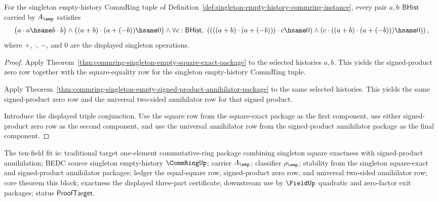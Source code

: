 \begin{theorem}
\label{thm:commring-singleton-empty-square-signed-product-package}
For the singleton empty-history CommRing tuple of
Definition~\ref{def:singleton-empty-history-commring-instance}, every pair
$a,b:\mathsf{BHist}$ carried by $A_{\emp}$ satisfies
$$
\bigl(a\cdot a\hsame b\cdot b\bigr)
\land
\bigl((a+b)\cdot(a+(-b))\hsame0\bigr)
\land
\forall c:\mathsf{BHist},\
\left(
(((a+b)\cdot(a+(-b)))\cdot c\hsame0)
\land
(c\cdot((a+b)\cdot(a+(-b)))\hsame0)
\right),
$$
where $+$, $\cdot$, $-$, and $0$ are the displayed singleton operations.
\end{theorem}
\begin{proof}
Apply
Theorem~\ref{thm:commring-singleton-empty-square-exact-package} to the selected
histories $a,b$. This yields the signed-product zero row together with the
square-equality row for the singleton empty-history CommRing tuple.

Apply
Theorem~\ref{thm:commring-singleton-empty-signed-product-annihilator-package} to
the same selected histories. This yields the same signed-product zero row and
the universal two-sided annihilator row for that signed product.

Introduce the displayed triple conjunction. Use the square row from the
square-exact package as the first component, use either signed-product zero row
as the second component, and use the universal annihilator row from the
signed-product annihilator package as the final component.
\end{proof}

The ten-field fit is: traditional target one-element commutative-ring package
combining singleton square exactness with signed-product annihilation; BEDC
source singleton empty-history $\CommRingUp$; carrier $A_{\emp}$; classifier
$\rho_{\emp}$; stability from the singleton square-exact and signed-product
annihilator packages; ledger the equal-square row, signed-product zero row, and
universal two-sided annihilator row; core theorem this block; exactness the
displayed three-part certificate; downstream use by $\FieldUp$ quadratic and
zero-factor exit packages; status $\mathsf{ProofTarget}$.

